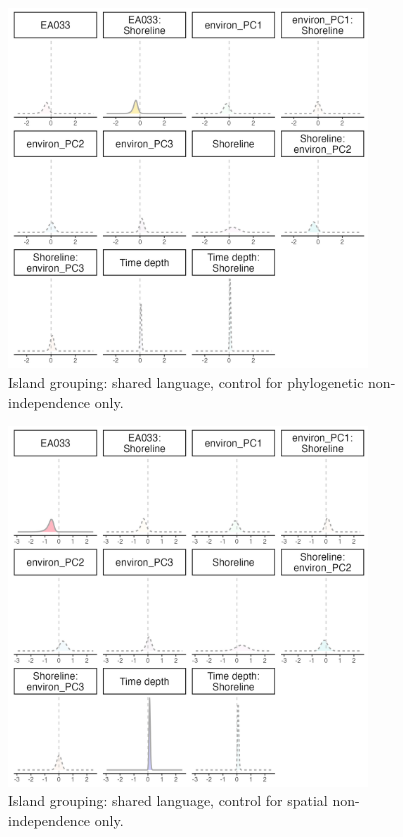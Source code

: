 \documentclass[unnumsec,webpdf,modern,medium]{oup-authoring-template}
\begin{document}
\begin{figure}[ht]
\includegraphics[width=0.85\textwidth]{brms_medium_control_phylo_group_full_effect_ridge_panels_plot.png}
\caption{Island grouping: shared language, control for phylogenetic non-independence only.}
\label{brms_medium_group_full_effect_ridge_panels_phylo}
\end{figure}


\begin{figure}[ht]
\includegraphics[width=0.85\textwidth]{brms_medium_control_spatial_group_full_effect_ridge_panels_plot.png}
\caption{Island grouping: shared language, control for spatial non-independence only. }
\label{brms_medium_control_spatial_group_full_effect_ridge_panels_plot}
\end{figure}
\end{document}

